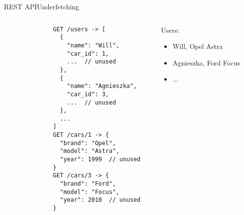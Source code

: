 \documentclass[notes]{beamer}
\begin{document}
  \begin{frame}[fragile]{REST API}{Underfetching}
    \begin{columns}
        \begin{column}{0.48\textwidth}
          \scriptsize
          \begin{verbatim}
              GET /users -> [
                {
                  "name": "Will",
                  "car_id": 1,
                  ...  // unused
                },
                {
                  "name": "Agnieszka",
                  "car_id": 3,
                  ...  // unused
                },
                ...
              ]
              GET /cars/1 -> {
                "brand": "Opel",
                "model": "Astra",
                "year": 1999  // unused
              }
              GET /cars/3 -> {
                "brand": "Ford",
                "model": "Focus",
                "year": 2010  // unused
              }
          \end{verbatim}
        \end{column}
        \begin{column}{0.48\textwidth}
          Users:
          \begin{itemize}
            \item Will, Opel Astra
            \item Agnieszka, Ford Focus
            \item ...
          \end{itemize}
        \end{column}
    \end{columns}
  \end{frame}
\end{document}
